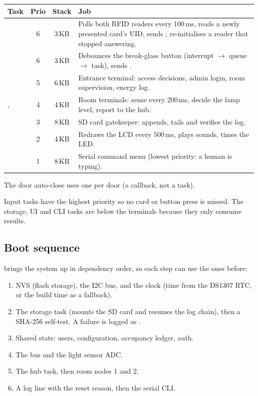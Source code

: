 \begin{center}
\small
\begin{tabularx}{\linewidth}{@{}lccL@{}}
\toprule
Task & Prio & Stack & Job \\
\midrule
{}    & 6 & 3\,KB & Polls both RFID readers every 100\,ms, reads a newly presented card's
  UID, sends ; re-initialises a reader that stopped answering. \\
 & 6 & 3\,KB & Debounces the break-glass button (interrupt $\rightarrow$ queue
  $\rightarrow$ task), sends . \\
     & 5 & 6\,KB & Entrance terminal: access decisions, admin login, room supervision,
  energy log. \\
,  & 4 & 4\,KB & Room terminals: sense every 200\,ms, decide the lamp
  level, report to the hub. \\
 & 3 & 8\,KB & SD card gatekeeper: appends, tails and verifies the log. \\
      & 2 & 4\,KB & Redraws the LCD every 500\,ms, plays sounds, times the LED. \\
     & 1 & 8\,KB & Serial command menu (lowest priority: a human is typing). \\
\bottomrule
\end{tabularx}
\end{center}
The door auto-close uses one  per door (a callback, not a task).

Input tasks have the highest priority so no card or button press is missed. The storage, UI and CLI tasks
are below the terminals because they only consume results.

\subsection{Boot sequence}
 brings the system up in dependency order, so each step can use the ones before:
\begin{enumerate}
  \item NVS (flash storage), the I2C bus, and the clock (time from the DS1307 RTC, or the build
        time as a fallback).
  \item The storage task (mounts the SD card and resumes the log chain), then a SHA-256 self-test.
        A failure is logged as .
  \item Shared state: users, configuration, occupancy ledger, auth.
  \item The bus and the light sensor ADC.
  \item The hub task, then room nodes 1 and 2.
  \item A  log line with the reset reason, then the serial CLI.
\end{enumerate}

